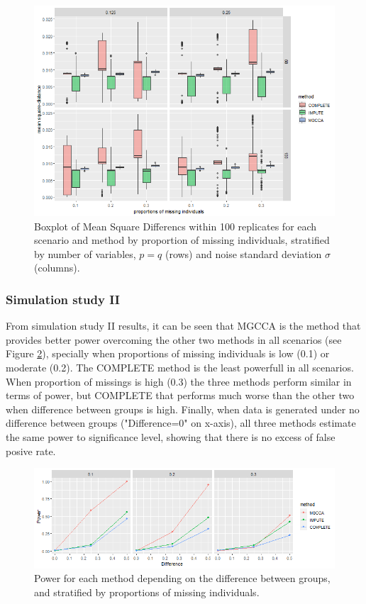 \documentclass[article]{jss}
\begin{document}
\begin{figure}[t!]
\centering
\includegraphics{./simulations/case1/plot1b}
\caption{\label{fig:MSD2} Boxplot of Mean Square Differencs within 100 replicates for each scenario and method by  proportion of missing individuals, stratified by number of variables, $p=q$ (rows) and noise standard deviation $\sigma$ (columns).}
\end{figure}



\subsubsection{Simulation study II}


From simulation study II results, it can be seen that MGCCA is the method that provides better power overcoming the other two methods in all scenarios (see Figure \ref{fig:pow}), specially when proportions of missing individuals is low (0.1) or moderate (0.2). The COMPLETE method is the least powerfull in all scenarios.
When proportion of missings is high (0.3) the three methods perform similar in terms of power, but COMPLETE that performs much worse than the other two when difference between groups is high.
Finally, when data is generated under no difference between groups ("Difference=0" on x-axis), all three methods estimate the same power to significance level, showing that there is no excess of false posive rate. 

\begin{figure}[t!]
\centering
\includegraphics[width=1\textwidth]{./simulations/case2/plot2}
\caption{\label{fig:pow} Power for each method depending on the difference between groups, and stratified by proportions of missing individuals.}
\end{figure}
\end{document}
